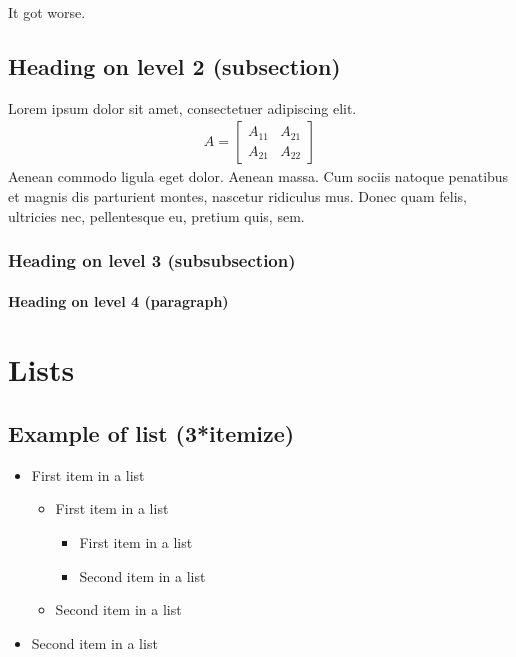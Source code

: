 \documentclass[paper=a4, fontsize=11pt]{scrartcl} %
\numberwithin{equation}{section} %
\numberwithin{figure}{section} %
\numberwithin{table}{section} %
\begin{document}
It got worse. 



\subsection{Heading on level 2 (subsection)}

Lorem ipsum dolor sit amet, consectetuer adipiscing elit. 
\begin{align}
A = 
\begin{bmatrix}
A_{11} & A_{21} \\
A_{21} & A_{22}
\end{bmatrix}
\end{align}
Aenean commodo ligula eget dolor. Aenean massa. Cum sociis natoque penatibus et magnis dis parturient montes, nascetur ridiculus mus. Donec quam felis, ultricies nec, pellentesque eu, pretium quis, sem.


\subsubsection{Heading on level 3 (subsubsection)}

\lipsum[3] %

\paragraph{Heading on level 4 (paragraph)}

\lipsum[6] %


\section{Lists}


\subsection{Example of list (3*itemize)}
\begin{itemize}
    \item First item in a list 
        \begin{itemize}
        \item First item in a list 
            \begin{itemize}
            \item First item in a list 
            \item Second item in a list 
            \end{itemize}
        \item Second item in a list 
        \end{itemize}
    \item Second item in a list 
\end{itemize}
\end{document}
